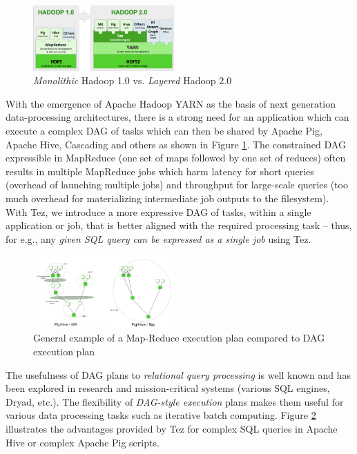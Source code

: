 \documentclass[twocolumn]{article}
\begin{document}
\begin{figure}[htb]
        \centering
        \includegraphics[width=0.48\textwidth]{hadoopstack}
        \caption{\textit{Monolithic} Hadoop 1.0 vs. \textit{Layered} Hadoop 2.0}
        \label{fig01}
\end{figure}

With the emergence of Apache Hadoop YARN as the basis of next generation
data-processing architectures, there is a strong need for an application
which can execute a complex DAG of tasks which can then be shared by
Apache Pig, Apache Hive, Cascading and others as shown in Figure \ref{fig01}. The constrained DAG
expressible in MapReduce (one set of maps followed by one set of
reduces) often results in multiple MapReduce jobs which harm latency for
short queries (overhead of launching multiple jobs) and throughput for
large-scale queries (too much overhead for materializing intermediate
job outputs to the filesystem). With Tez, we introduce a more expressive
DAG of tasks, within a single application or job, that is better aligned
with the required processing task -- thus, for e.g., any \emph{given SQL
query can be expressed as a single job} using Tez.

\begin{figure}[htb]
        \centering
        \includegraphics[width=0.48\textwidth]{pighivetez.png}
        \caption{General example of a Map-Reduce execution plan compared to DAG execution plan}
        \label{fig02}
\end{figure}

The usefulness of DAG plans to \textit{relational query processing} is well known and has been explored in research and mission-critical systems (various SQL engines, Dryad, etc.).   The flexibility of\textit{ DAG-style execution} plans makes them useful for various data processing tasks such as iterative batch computing.
Figure \ref{fig02} illustrates the advantages provided by Tez for complex
SQL queries in Apache Hive or complex Apache Pig scripts.
\end{document}
